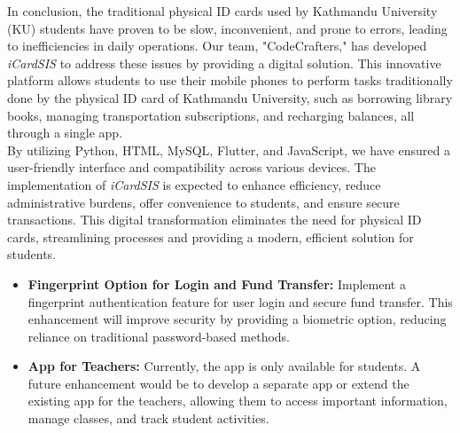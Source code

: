 \documentclass[a4paper,14pt]{article}
\begin{document}
{{{{{{{{{{{{{{{{{		
		\vspace{0.5cm}
		{
			\noindent \normalsize
			\justifying In conclusion, the traditional physical ID cards used by Kathmandu University (KU) students have proven to be slow, inconvenient, and prone to errors, leading to inefficiencies in daily operations. Our team, "CodeCrafters," has developed \textit{iCardSIS} to address these issues by providing a digital solution. This innovative platform allows students to use their mobile phones to perform tasks traditionally done by the physical ID card of Kathmandu University, such as borrowing library books, managing transportation subscriptions, and recharging balances, all through a single app. \\By utilizing Python, HTML, MySQL, Flutter, and JavaScript, we have ensured a user-friendly interface and compatibility across various devices. The implementation of \textit{iCardSIS} is expected to enhance efficiency, reduce administrative burdens, offer convenience to students, and ensure secure transactions. This digital transformation eliminates the need for physical ID cards, streamlining processes and providing a modern, efficient solution for students. 
		\vspace{0.5cm}    
		{
			\noindent \normalsize
			\justifying \begin{itemize}
				\item \textbf{Fingerprint Option for Login and Fund Transfer:} Implement a fingerprint authentication feature for user login and secure fund transfer. This enhancement will improve security by providing a biometric option, reducing reliance on traditional password-based methods.
				
				\item \textbf{App for Teachers:} Currently, the app is only available for students. A future enhancement would be to develop a separate app or extend the existing app for the teachers, allowing them to access important information, manage classes, and track student activities.
				

\end{itemize}}}}}}}}}}}}}}}}}}}}
\end{document}
